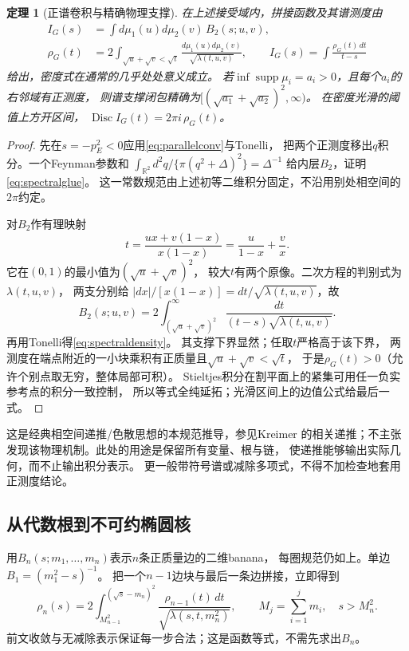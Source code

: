 \documentclass[11pt,a4paper]{ctexart}
\theoremstyle{cnplain}\newtheorem{theorem}{定理}[section]
\theoremstyle{definition}\newtheorem{definition}[theorem]{定义}
\theoremstyle{remark}\newtheorem{remark}[theorem]{注}
\begin{document}
\begin{theorem}[正谱卷积与精确物理支撑]\label{thm:spectralglue}
在上述接受域内，拼接函数及其谱测度由
\begin{align}
 I_G(s)&=\int d\mu_1(u)d\mu_2(v)\,B_2(s;u,v),\label{eq:spectralglue}\\
 \rho_G(t)&=2\int_{\sqrt u+\sqrt v<\sqrt t}
    \frac{d\mu_1(u)d\mu_2(v)}{\sqrt{\lambda(t,u,v)}},\qquad
 I_G(s)=\int\frac{\rho_G(t)\,dt}{t-s}                       \label{eq:spectraldensity}
\end{align}
给出，密度式在通常的几乎处处意义成立。
若$\inf\operatorname{supp}\mu_i=a_i>0$，且每个$a_i$的右邻域有正测度，
则谱支撑闭包精确为$[(\sqrt{a_1}+\sqrt{a_2})^2,\infty)$。
在密度光滑的阈值上方开区间，
$\operatorname{Disc}I_G(t)=2\pi i\,\rho_G(t)$。
\end{theorem}
\begin{proof}
先在$s=-p_E^2<0$应用\eqref{eq:parallelconv}与Tonelli，
把两个正测度移出$q$积分。一个Feynman参数和
$\int_{\mathbb R^2}d^2q/\{\pi(q^2+\Delta)^2\}=\Delta^{-1}$
给内层$B_2$，证明\eqref{eq:spectralglue}。
这一常数规范由上述初等二维积分固定，不沿用别处相空间的$2\pi$约定。

对$B_2$作有理映射
\[
 t=\frac{ux+v(1-x)}{x(1-x)}=\frac{u}{1-x}+\frac{v}{x}.
\]
它在$(0,1)$的最小值为$(\sqrt u+\sqrt v)^2$，
较大$t$有两个原像。二次方程的判别式为$\lambda(t,u,v)$，
两支分别给
$|dx|/[x(1-x)]=dt/\sqrt{\lambda(t,u,v)}$，故
\[
 B_2(s;u,v)=
 2\int_{(\sqrt u+\sqrt v)^2}^{\infty}
       \frac{dt}{(t-s)\sqrt{\lambda(t,u,v)}} .
\]
再用Tonelli得\eqref{eq:spectraldensity}。
其支撑下界显然；任取$t$严格高于该下界，
两测度在端点附近的一小块乘积有正质量且$\sqrt u+\sqrt v<\sqrt t$，
于是$\rho_G(t)>0$（允许个别点取无穷，整体局部可积）。
Stieltjes积分在割平面上的紧集可用任一负实参考点的积分一致控制，
所以等式全纯延拓；光滑区间上的边值公式给最后一式。
\end{proof}

这是经典相空间递推/色散思想的本规范推导，参见Kreimer\cite{KreimerBanana}
的相关递推；不主张发现该物理机制。此处的用途是保留所有变量、根与链，
使递推能够输出实际几何，而不止输出积分表示。
更一般带符号谱或减除多项式，不得不加检查地套用正测度结论。

\subsection{从代数根到不可约椭圆核}
用$B_n(s;m_1,\ldots,m_n)$表示$n$条正质量边的二维banana，
每圈规范仍如上。单边$B_1=(m_1^2-s)^{-1}$。
把一个$n-1$边块与最后一条边拼接，立即得到
\begin{equation}\label{eq:bananarhoiter}
 \rho_n(s)=2\int_{M_{n-1}^2}^{(\sqrt s-m_n)^2}
 \frac{\rho_{n-1}(t)\,dt}{\sqrt{\lambda(s,t,m_n^2)}},
 \qquad M_j=\sum_{i=1}^j m_i,\quad s>M_n^2 .
\end{equation}
前文收敛与无减除表示保证每一步合法；这是函数等式，不需先求出$B_n$。
\end{document}
